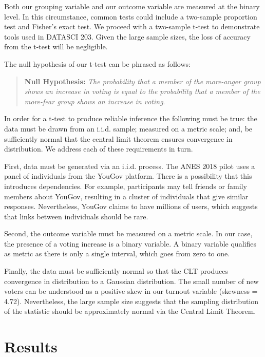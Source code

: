 \documentclass[
  letterpaper,
  DIV=11,
  numbers=noendperiod,
  onecolumn]{scrartcl}
\begin{document}
Both our grouping variable and our outcome variable are measured at the
binary level. In this circumstance, common tests could include a
two-sample proportion test and Fisher's exact test. We proceed with a
two-sample t-test to demonstrate tools used in DATASCI 203. Given the
large sample sizes, the loss of accuracy from the t-test will be
negligible.

The null hypothesis of our t-test can be phrased as follows:

\begin{quote}
\textbf{Null Hypothesis:} \emph{The probability that a member of the
more-anger group shows an increase in voting is equal to the probability
that a member of the more-fear group shows an increase in voting}.
\end{quote}

In order for a t-test to produce reliable inference the following must
be true: the data must be drawn from an i.i.d. sample; measured on a
metric scale; and, be sufficiently normal that the central limit theorem
ensures convergence in distribution. We address each of these
requirements in turn.

First, data must be generated via an i.i.d. process. The ANES 2018 pilot
uses a panel of individuals from the YouGov platform. There is a
possibility that this introduces dependencies. For example, participants
may tell friends or family members about YouGov, resulting in a cluster
of individuals that give similar responses. Nevertheless, YouGov claims
to have millions of users, which suggests that links between individuals
should be rare.

Second, the outcome variable must be measured on a metric scale. In our
case, the presence of a voting increase is a binary variable. A binary
variable qualifies as metric as there is only a single interval, which
goes from zero to one.

Finally, the data must be sufficiently normal so that the CLT produces
convergence in distribution to a Gaussian distribution. The small number
of new voters can be understood as a positive skew in our turnout
variable (skewness = 4.72). Nevertheless, the large sample size suggests
that the sampling distribution of the statistic should be approximately
normal via the Central Limit Theorem.

\section{Results}\label{results}
\end{document}
